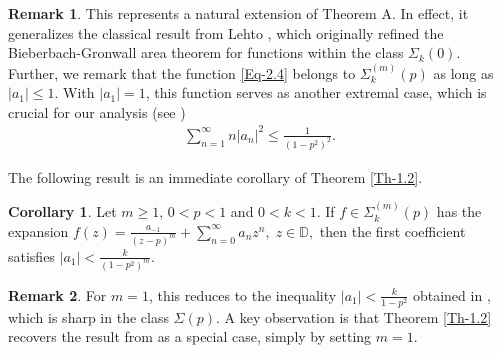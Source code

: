 \documentclass[a4paper,12pt]{amsart}
\theoremstyle{plain}
\theoremstyle{definition}
\newtheorem{cor}{Corollary}[section]
\newtheorem{rem}{Remark}[section]
\begin{document}
\begin{rem}
This represents a natural extension of Theorem A. In effect, it generalizes the classical result from Lehto \cite{Lehto-1971}, which originally refined the Bieberbach-Gronwall area theorem for functions within the class $\Sigma_k(0)$. Further, we remark that the function \eqref{Eq-2.4} belongs to $\Sigma_k^{(m)}(p)$ as long as $|a_1|\leq 1$. With $|a_1|=1$, this function serves as another extremal case, which is crucial for our analysis (see \cite{Chichra1969}) 
	\begin{align*}
		\sum_{n=1}^{\infty}n|a_n|^2\leq \frac{1}{\left(1-p^2\right)^2}.
	\end{align*} 
\end{rem}
The following result is an immediate corollary of Theorem \ref{Th-1.2}.
\begin{cor}
Let $m\geq 1$, $0<p<1$ and $0<k<1$. 
If $f\in \Sigma^{(m)}_{k}(p)$ has the expansion $f(z)=\frac{a_{-1}}{(z-p)^{m}}+\sum_{n=0}^{\infty} a_{n} z^{n},\; z\in\mathbb{D},$ then the first coefficient satisfies $|a_{1}| < \frac{k}{(1-p^{2})^{m}}.$
\end{cor}
\begin{rem}
For $m=1$, this reduces to the inequality 
$|a_{1}|<\frac{k}{1-p^{2}}$ obtained in \cite[Corollary 1]{Bhowmik-PAMS-2016}, which is sharp in the class $\Sigma(p)$. A key observation is that Theorem \ref{Th-1.2} recovers the result from \cite[Theorem 1]{Bhowmik-PAMS-2016} as a special case, simply by setting $m=1$.
\end{rem}
\end{document}

